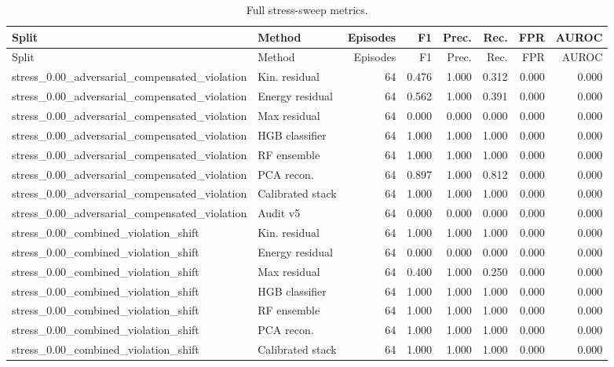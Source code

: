 {\scriptsize
\setlength{\tabcolsep}{2.5pt}
\begin{longtable}{llrrrrrr}
\caption{Full stress-sweep metrics.}\label{tab:full-stress}\\
\toprule
Split & Method & Episodes & F1 & Prec. & Rec. & FPR & AUROC \\
\midrule
\endfirsthead
\toprule
Split & Method & Episodes & F1 & Prec. & Rec. & FPR & AUROC \\
\midrule
\endhead
stress\_0.00\_adversarial\_compensated\_violation & Kin. residual & 64 & 0.476 & 1.000 & 0.312 & 0.000 & 0.000 \\
stress\_0.00\_adversarial\_compensated\_violation & Energy residual & 64 & 0.562 & 1.000 & 0.391 & 0.000 & 0.000 \\
stress\_0.00\_adversarial\_compensated\_violation & Max residual & 64 & 0.000 & 0.000 & 0.000 & 0.000 & 0.000 \\
stress\_0.00\_adversarial\_compensated\_violation & HGB classifier & 64 & 1.000 & 1.000 & 1.000 & 0.000 & 0.000 \\
stress\_0.00\_adversarial\_compensated\_violation & RF ensemble & 64 & 1.000 & 1.000 & 1.000 & 0.000 & 0.000 \\
stress\_0.00\_adversarial\_compensated\_violation & PCA recon. & 64 & 0.897 & 1.000 & 0.812 & 0.000 & 0.000 \\
stress\_0.00\_adversarial\_compensated\_violation & Calibrated stack & 64 & 1.000 & 1.000 & 1.000 & 0.000 & 0.000 \\
stress\_0.00\_adversarial\_compensated\_violation & Audit v5 & 64 & 0.000 & 0.000 & 0.000 & 0.000 & 0.000 \\
stress\_0.00\_combined\_violation\_shift & Kin. residual & 64 & 1.000 & 1.000 & 1.000 & 0.000 & 0.000 \\
stress\_0.00\_combined\_violation\_shift & Energy residual & 64 & 0.000 & 0.000 & 0.000 & 0.000 & 0.000 \\
stress\_0.00\_combined\_violation\_shift & Max residual & 64 & 0.400 & 1.000 & 0.250 & 0.000 & 0.000 \\
stress\_0.00\_combined\_violation\_shift & HGB classifier & 64 & 1.000 & 1.000 & 1.000 & 0.000 & 0.000 \\
stress\_0.00\_combined\_violation\_shift & RF ensemble & 64 & 1.000 & 1.000 & 1.000 & 0.000 & 0.000 \\
stress\_0.00\_combined\_violation\_shift & PCA recon. & 64 & 1.000 & 1.000 & 1.000 & 0.000 & 0.000 \\
stress\_0.00\_combined\_violation\_shift & Calibrated stack & 64 & 1.000 & 1.000 & 1.000 & 0.000 & 0.000 \\

\end{longtable}}
